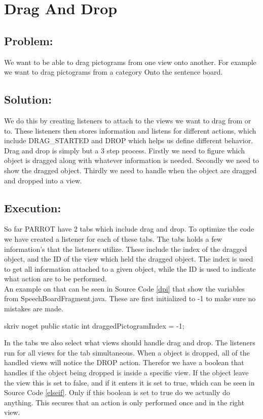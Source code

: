 \section{Drag And Drop} 
\label{dnd}
\subsection*{Problem:}
We want to be able to drag pictograms from one view onto another. 
For example we want to drag pictograms from a category Onto the sentence board. 


\subsection*{Solution:}
We do this by creating listeners to attach to the views we want to drag from or to. 
These listeners then stores information and listens for different actions, which include DRAG\_STARTED and DROP which helps us define different behavior.
Drag and drop is simply but a 3 step process.
Firstly we need to figure which object is dragged along with whatever information is needed. 
Secondly we need to show the dragged object.
Thirdly we need to handle when the object are dragged and dropped into a view.

\subsection*{Execution:}
So far PARROT have 2 tabs which include drag and drop. To optimize the code we have created a listener for each of these tabs.
The tabs holds a few information's that the listeners utilize. These include the index of the dragged object, and the ID of the view which held the dragged object. The index is used to get all information attached to a given object, while the ID is used to indicate what action are to be performed.\\
An example on that can be seen in Source Code \ref{dpi} that show the variables from SpeechBoardFragment.java.
These are first initialized to -1 to make sure no mistakes are made.

\begin{source}[{dpi}]{skriv noget}
public static int draggedPictogramIndex = -1;
\end{source} 

In the tabs we also select what views should handle drag and drop.
The listeners run for all views for the tab simultaneous. When a object is dropped, all of the handled views will notice the DROP action. Therefor we have a boolean that handles if the object being dropped is inside a specific view. 
If the object leave the view this is set to false, and if it enters it is set to true, which can be seen in Source Code \ref{elseif}. 
Only if this boolean is set to true do we actually do anything. This secures that an action is only performed once and in the right view. 

